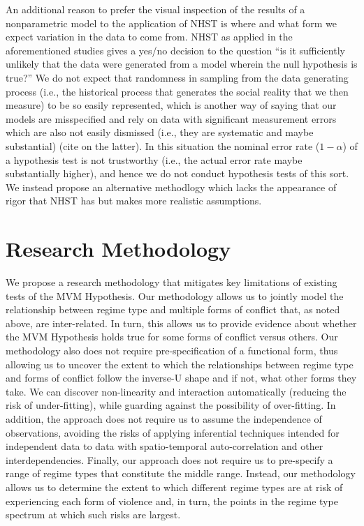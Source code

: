\documentclass[titlepage, onecolumn,12pt]{article}
\begin{document}
An additional reason to prefer the visual inspection of the results of a nonparametric model to the application of NHST is where and what form we expect variation in the data to come from. NHST as applied in the aforementioned studies gives a yes/no decision to the question ``is it sufficiently unlikely that the data were generated from a model wherein the null hypothesis is true?'' We do not expect that randomness in sampling from the data generating process (i.e., the historical process that generates the social reality that we then measure) to be so easily represented, which is another way of saying that our models are misspecified and rely on data with significant measurement errors which are also not easily dismissed (i.e., they are systematic and maybe substantial) (cite on the latter). In this situation the nominal error rate ($1 - \alpha$) of a hypothesis test is not trustworthy (i.e., the actual error rate maybe substantially higher), and hence we do not conduct hypothesis tests of this sort. We instead propose an alternative methodlogy which lacks the appearance of rigor that NHST has but makes more realistic assumptions.

\section{Research Methodology}

We propose a research methodology that mitigates key limitations of existing tests of the MVM Hypothesis. Our methodology allows us to jointly model the relationship between regime type and multiple forms of conflict that, as noted above, are inter-related. In turn, this allows us to provide evidence about whether the MVM Hypothesis holds true for some forms of conflict versus others. Our methodology also does not require pre-specification of a functional form, thus allowing us to uncover the extent to which the relationships between regime type and forms of conflict follow the inverse-U shape and if not, what other forms they take. We can discover non-linearity and interaction automatically (reducing the risk of under-fitting), while guarding against the possibility of over-fitting. In addition, the approach does not require us to assume the independence of observations, avoiding the risks of applying inferential techniques intended for independent data to data with spatio-temporal auto-correlation and other interdependencies. Finally, our approach does not require us to pre-specify a range of regime types that constitute the middle range. Instead, our methodology allows us to determine the extent to which different regime types are at risk of experiencing each form of violence and, in turn, the points in the regime type spectrum at which such risks are largest.
\end{document}
